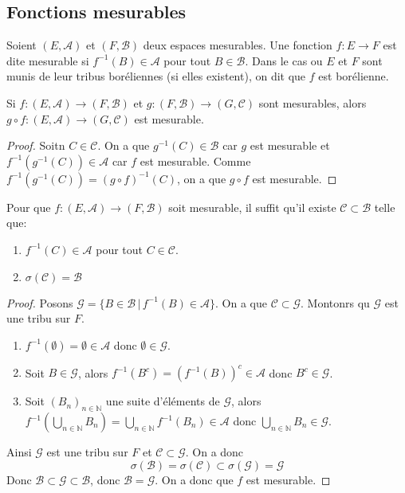 \subsection{Fonctions mesurables}

\begin{definition}
	Soient $(E, \mathscr{A})$ et $(F, \mathscr{B})$ deux espaces mesurables. Une fonction $f: E \to F$ est dite mesurable si
	$f^{-1}(B) \in \mathscr{A}$ pour tout $B \in \mathscr{B}$.
	Dans le cas ou $E$ et $F$ sont munis de leur tribus boréliennes (si elles existent), on dit que $f$ est borélienne.
\end{definition}


\begin{prop}
	Si $f: (E, \mathscr{A}) \to (F, \mathscr{B})$ et $g: (F, \mathscr{B}) \to (G, \mathscr{C})$
	sont mesurables, alors $g \circ f : (E, \mathscr{A}) \to (G, \mathscr{C})$ est mesurable.
\end{prop}

\begin{proof}
	Soitn $C \in \mathscr{C}$. On a que $g^{-1}(C) \in \mathscr{B}$ car $g$ est mesurable et
	$f^{-1}(g^{-1}(C)) \in \mathscr{A}$ car $f$ est mesurable.
	Comme $f^{-1}(g^{-1}(C)) = (g \circ f)^{-1}(C)$, on a que $g \circ f$ est mesurable.
\end{proof}


\begin{prop}
	Pour que $f : (E, \mathscr{A}) \to (F, \mathscr{B})$ soit mesurable, il suffit qu'il existe $\mathscr{C} \subset \mathscr{B}$ telle que:
	\begin{enumerate}
		\item $f^{-1}(C) \in \mathscr{A}$ pour tout $C \in \mathscr{C}$.
		\item $\sigma(\mathscr{C}) = \mathscr{B}$
	\end{enumerate}
\end{prop}

\begin{proof}
	Posons $\mathscr{G} = \{ B \in \mathscr{B} \, | \, f^{-1}(B) \in \mathscr{A} \}$. On a que $\mathscr{C} \subset \mathscr{G}$.
	Montonrs qu $\mathscr{G}$ est une tribu sur $F$.
	\begin{enumerate}
		\item $f^{-1}(\emptyset) = \emptyset \in \mathscr{A}$ donc $\emptyset \in \mathscr{G}$.
		\item Soit $B \in \mathscr{G}$, alors $f^{-1}(B^c) = (f^{-1}(B))^c \in \mathscr{A}$ donc $B^c \in \mathscr{G}$.
		\item Soit $(B_n)_{n \in \mathbb{N}}$ une suite d'éléments de $\mathscr{G}$, alors
		      $f^{-1}(\bigcup\limits_{n \in \mathbb{N}} B_n) = \bigcup\limits_{n \in \mathbb{N}} f^{-1}(B_n) \in \mathscr{A}$ donc
		      $\bigcup\limits_{n \in \mathbb{N}} B_n \in \mathscr{G}$.
	\end{enumerate}
	Ainsi $\mathscr{G}$ est une tribu sur $F$ et $\mathscr{C} \subset \mathscr{G}$.
	On a donc
	\[ \sigma(\mathscr{B}) = \sigma(\mathscr{C}) \subset \sigma(\mathscr{G}) = \mathscr{G} \]
	Donc $\mathscr{B} \subset \mathscr{G} \subset \mathscr{B}$, donc $\mathscr{B} = \mathscr{G}$.
	On a donc que $f$ est mesurable.
\end{proof}


